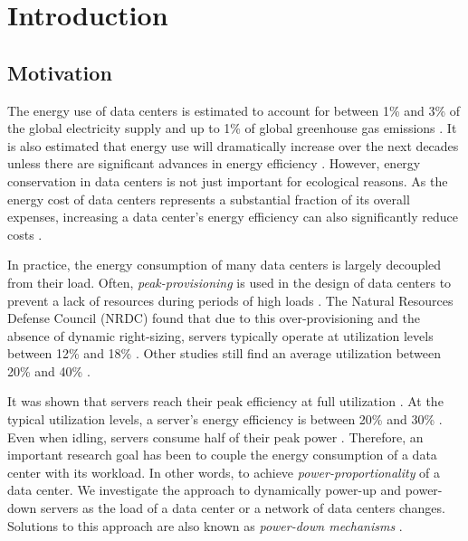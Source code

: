 
\chapter{Introduction}\label{chapter:introduction}

\section{Motivation}

The energy use of data centers is estimated to account for between 1\% and 3\% of the global electricity supply and up to 1\% of global greenhouse gas emissions \cite{Shehabi2016, Jones2018, Bashroush2020, Masanet2020}. It is also estimated that energy use will dramatically increase over the next decades unless there are significant advances in energy efficiency \cite{Jones2018}. However, energy conservation in data centers is not just important for ecological reasons. As the energy cost of data centers represents a substantial fraction of its overall expenses, increasing a data center's energy efficiency can also significantly reduce costs \cite{Barroso2007, Brill2007, Hamilton2008}.

In practice, the energy consumption of many data centers is largely decoupled from their load. Often, \emph{peak-provisioning} is used in the design of data centers to prevent a lack of resources during periods of high loads \cite{Whitney2014}. The Natural Resources Defense Council (NRDC) found that due to this over-provisioning and the absence of dynamic right-sizing, servers typically operate at utilization levels between 12\% and 18\% \cite{Whitney2014}. Other studies still find an average utilization between 20\% and 40\% \cite{Barroso2007, Armbrust2010}.

It was shown that servers reach their peak efficiency at full utilization \cite{Barroso2007}. At the typical utilization levels, a server's energy efficiency is between 20\% and 30\% \cite{Barroso2007}. Even when idling, servers consume half of their peak power \cite{Barroso2007}. Therefore, an important research goal has been to couple the energy consumption of a data center with its workload. In other words, to achieve \emph{power-proportionality} of a data center. We investigate the approach to dynamically power-up and power-down servers as the load of a data center or a network of data centers changes. Solutions to this approach are also known as \emph{power-down mechanisms} \cite{Jin2016}.

